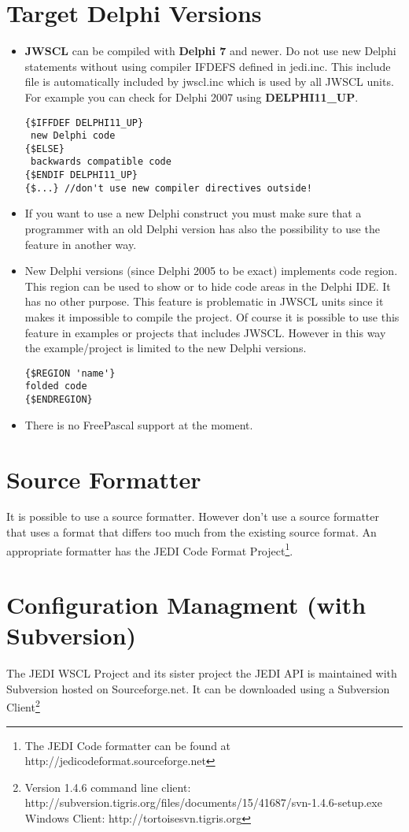 \documentclass[a4paper,twoside,10pt]{report}
\begin{document}
\section{Target Delphi Versions}
\begin{itemize}
	\item \textbf{JWSCL} can be compiled with \textbf{Delphi 7} and newer. Do not use new Delphi statements without using compiler IFDEFS defined in jedi.inc. This include file is automatically included by jwscl.inc which is used by all JWSCL units. For example you can check for Delphi 2007 using \textbf{DELPHI11\_UP}.
\begin{lstlisting} 
{$IFFDEF DELPHI11_UP}
 new Delphi code
{$ELSE}
 backwards compatible code
{$ENDIF DELPHI11_UP}
{$...} //don't use new compiler directives outside!
\end{lstlisting}  
\item If you want to use a new Delphi construct you must make sure that a programmer with an old Delphi version has also the possibility to use the feature in another way.
\item New Delphi versions (since Delphi 2005 to be exact) implements code region. This region can be used to show or to hide code areas in the Delphi IDE. It has no other purpose. This feature is problematic in JWSCL units since it makes it impossible to compile the project. Of course it is possible to use this feature in examples or projects that includes JWSCL. However in this way the example/project is limited to the new Delphi versions.

\begin{lstlisting}
{$REGION 'name'}
folded code    
{$ENDREGION}
\end{lstlisting}

\item There is no FreePascal support at the moment.
\end{itemize}

\section{Source Formatter}
It is possible to use a source formatter. However don't use a source formatter that uses a format that differs too much from the existing source format. An appropriate formatter has the JEDI Code Format Project\footnote{The JEDI Code formatter can be found at http://jedicodeformat.sourceforge.net}.

\section{Configuration Managment (with Subversion)}
The JEDI WSCL Project and its sister project the JEDI API is maintained with Subversion hosted on Sourceforge.net.
It can be downloaded using a Subversion Client\footnote{Version 1.4.6 command line client: http://subversion.tigris.org/files/documents/15/41687/svn-1.4.6-setup.exe\\Windows Client: http://tortoisesvn.tigris.org}
\end{document}
